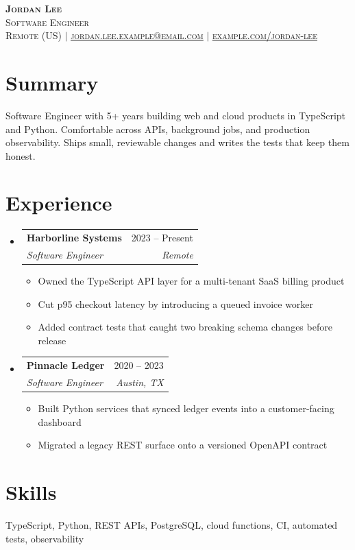 \documentclass[letterpaper,11pt]{article}
\makeatletter
\newcommand{\resumeItem}[1]{\item\small{#1 \vspace{2pt}}}
\newcommand{\resumeSubheading}[4]{
  \vspace{-2pt}\item
  \begin{tabular*}{0.97\textwidth}[t]{l@{\extracolsep{\fill}}r}
    \textbf{#1} & #2 \\
    \textit{\small#3} & \textit{\small #4} \\
  \end{tabular*}\vspace{-7pt}
}
\newcommand{\resumeSubHeadingListStart}{\begin{itemize}[leftmargin=0.15in, label={}]}
\newcommand{\resumeSubHeadingListEnd}{\end{itemize}}
\newcommand{\resumeItemListStart}{\begin{itemize}}
\newcommand{\resumeItemListEnd}{\end{itemize}\vspace{-5pt}}
\makeatother
\begin{document}
\begin{center}
  \textbf{\Huge \scshape Jordan Lee} \\ \vspace{2pt}
  \small \scshape Software Engineer \\ \vspace{8pt}
  \footnotesize Remote (US)
  \enspace$\vert$\enspace
  \href{mailto:jordan.lee.example@email.com}{\underline{jordan.lee.example@email.com}}
  \enspace$\vert$\enspace
  \href{https://example.com/jordan-lee}{\underline{example.com/jordan-lee}}
\end{center}

\section{Summary}
\small{
Software Engineer with 5+ years building web and cloud products in TypeScript and Python.
Comfortable across APIs, background jobs, and production observability.
Ships small, reviewable changes and writes the tests that keep them honest.
}

\section{Experience}
\resumeSubHeadingListStart
  \resumeSubheading
  {Harborline Systems}{2023 -- Present}
  {Software Engineer}{Remote}
  \resumeItemListStart
    \resumeItem{Owned the TypeScript API layer for a multi-tenant SaaS billing product}
    \resumeItem{Cut p95 checkout latency by introducing a queued invoice worker}
    \resumeItem{Added contract tests that caught two breaking schema changes before release}
  \resumeItemListEnd
  \resumeSubheading
  {Pinnacle Ledger}{2020 -- 2023}
  {Software Engineer}{Austin, TX}
  \resumeItemListStart
    \resumeItem{Built Python services that synced ledger events into a customer-facing dashboard}
    \resumeItem{Migrated a legacy REST surface onto a versioned OpenAPI contract}
  \resumeItemListEnd
\resumeSubHeadingListEnd

\section{Skills}
\small{TypeScript, Python, REST APIs, PostgreSQL, cloud functions, CI, automated tests, observability}
\end{document}
